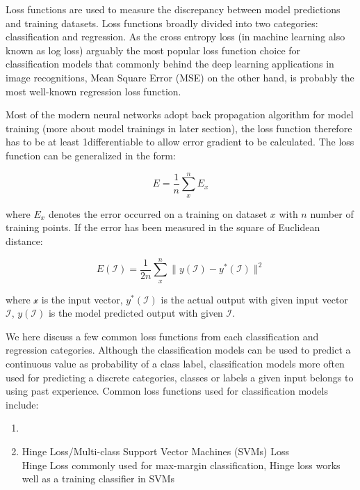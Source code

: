 Loss functions are used to measure the discrepancy between model predictions and training datasets. Loss functions broadly divided into two categories: classification and regression. As the cross entropy loss (in machine learning also known as log loss) arguably the most popular loss function choice for classification models that commonly behind the deep learning applications in image recognitions, Mean Square Error (MSE) on the other hand, is probably the most well-known regression loss function. 
\par 
Most of the modern neural networks adopt back propagation algorithm for model training (more about model trainings in later section), the loss function therefore has to be at least 1\textdegree differentiable to allow error gradient to be calculated. The loss function can be generalized in the form:

\begin{equation}
    E = \frac {1}{n} \sum_x^n E_x
\end{equation}

where $E_x$ denotes the error occurred on a training on dataset $x$ with $n$ number of training points. If the error has been measured in the square of Euclidean distance:

\begin{equation}
    E(\mathcal{I}) = \frac {1}{2n} \sum_x^n \parallel y(\mathcal{I}) - y^*(\mathcal{I}) \parallel^2 
\end{equation}

where $\mathcal{x}$ is the input vector, $y^*(\mathcal{I})$ is the actual output with given input vector $\mathcal{I}$, $y(\mathcal{I})$ is the model predicted output with given $\mathcal{I}$. 
\par 
We here discuss a few common loss functions from each classification and regression categories. Although the classification models can be used to predict a continuous value as probability of a class label, classification models more often used for predicting a discrete categories, classes or labels a given input belongs to using past experience. Common loss functions used for classification models include:

\begin{enumerate}
    \item  
    \item Hinge Loss/Multi-class Support Vector Machines (SVMs) Loss \\
Hinge Loss commonly used for max-margin classification, Hinge loss works well as a training classifier in SVMs~\cite{Cortes_1995}
\end {enumerate}

